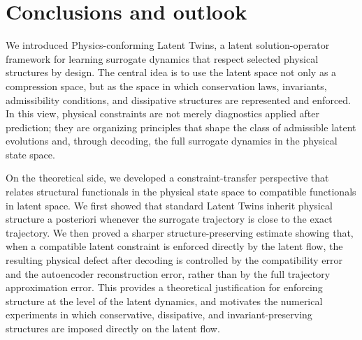\documentclass[a4paper,fleqn]{cas-sc}
\theoremstyle{thmstyleone}%
\theoremstyle{thmstyletwo}%
\theoremstyle{thmstylethree}%
\begin{document}
\section{Conclusions and outlook}\label{sec:conclusion}


We introduced Physics-conforming Latent Twins, a latent solution-operator framework for learning surrogate dynamics that respect selected physical structures by design. The central idea is to use the latent space not only as a compression space, but as the space in which conservation laws, invariants, admissibility conditions, and dissipative structures are represented and enforced. In this view, physical constraints are not merely diagnostics applied after prediction; they are organizing principles that shape the class of admissible latent evolutions and, through decoding, the full surrogate dynamics in the physical state space.

On the theoretical side, we developed a constraint-transfer perspective that relates structural functionals in the physical state space to compatible functionals in latent space. We first showed that standard Latent Twins inherit physical structure a posteriori whenever the surrogate trajectory is close to the exact trajectory. We then proved a sharper structure-preserving estimate showing that, when a compatible latent constraint is enforced directly by the latent flow, the resulting physical defect after decoding is controlled by the compatibility error and the autoencoder reconstruction error, rather than by the full trajectory approximation error. This provides a theoretical justification for enforcing structure at the level of the latent dynamics, and motivates the numerical experiments in which conservative, dissipative, and invariant-preserving structures are imposed directly on the latent flow.
\end{document}
